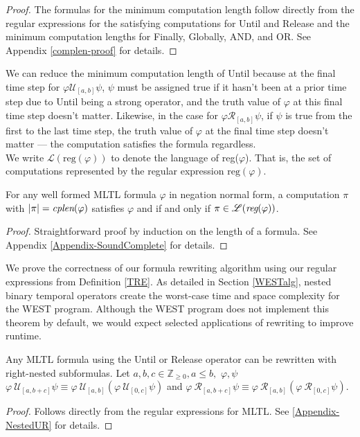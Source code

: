 \documentclass[runningheads]{llncs}
\renewcommand{\phi}{\varphi}
\begin{document}
\begin{proof}
The formulas for the minimum computation length follow directly from the regular expressions for the satisfying computations for Until and Release and the minimum computation lengths for Finally, Globally, AND, and OR. See Appendix \ref{complen-proof} for details.
 \end{proof}
 \noindent We can reduce the minimum computation length of Until because at the final time step for $\phi \mathcal{U}_{[a,b]} \psi$, $\psi$ must be assigned true if it hasn't been at a prior time step due to Until being a strong operator, and the truth value of $\phi$ at this final time step doesn't matter. Likewise, in the case for $\phi \mathcal{R}_{[a,b]} \psi$, if $\psi$ is true from the first to the last time step, the truth value of $\phi$ at the final time step doesn't matter — the computation satisfies the formula regardless.\\
 We write $\mathscr{L}(\text{reg}(\phi))$ to denote the language of reg($\phi$). That is, the set of computations represented by the regular expression $\text{reg}(\phi)$.
 \begin{theorem} \label{SoundComplete}
 For any well formed MLTL formula $\phi$ in negation normal form, a computation $\pi$ with $|\pi| = \emph{cplen}(\phi)$ satisfies $\phi$ and  if and only if $\pi \in \mathscr{L}(\emph{reg}(\phi))$.
 \end{theorem}
 \begin{proof}
     Straightforward proof by induction on the length of a formula. See Appendix \ref{Appendix-SoundComplete} for details.
 \end{proof}
 
 We prove the correctness of our formula rewriting algorithm using our regular expressions from Definition \ref{TRE}. As detailed in Section \ref{WESTalg}, nested binary temporal operators create the worst-case time and space complexity for the WEST program. Although the WEST program does not implement this theorem by default, we would expect selected applications of rewriting to improve runtime.
 
 \begin{theorem} \label{NestedUR}
   Any MLTL formula using the Until or Release operator can be rewritten with right-nested subformulas. Let $a,b,c \in \mathbb{Z}_{\geq 0} , a \leq b,$  $ \phi,   \psi$  $ \phi \ \mathcal{U}_{[a,b+c]} \psi \equiv \phi \ \mathcal{U}_{[a,b]}(\phi \ \mathcal{U}_{[0,c]} \psi)$ and $ \phi \ \mathcal{R}_{[a,b+c]} \psi \equiv \phi \ \mathcal{R}_{[a,b]}(\phi \ \mathcal{R}_{[0,c]} \psi)$.
\end{theorem}
\begin{proof}
    Follows directly from the regular expressions for MLTL. See \ref{Appendix-NestedUR} for details.
\end{proof}
\end{document}
